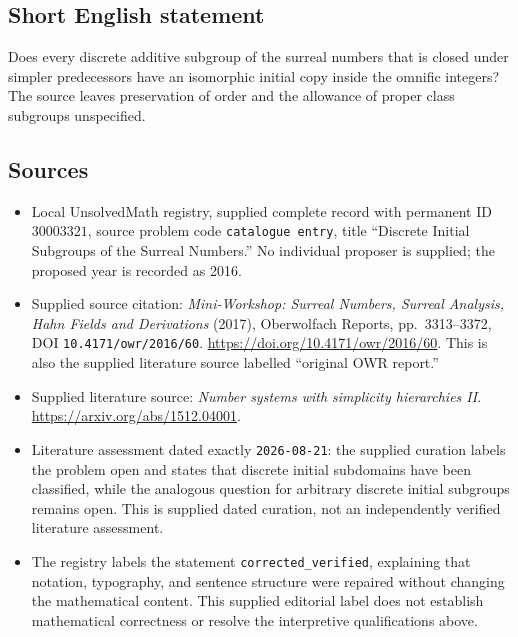 \documentclass[11pt]{article}
\begin{document}
\subsection{Short English statement}
Does every discrete additive subgroup of the surreal numbers that is closed under simpler predecessors have an isomorphic initial copy inside the omnific integers? The source leaves preservation of order and the allowance of proper class subgroups unspecified.
\subsection{Sources}
\begin{itemize}
\item Local UnsolvedMath registry, supplied complete record with permanent ID \(30003321\), source problem code \texttt{catalogue entry}, title ``Discrete Initial Subgroups of the Surreal Numbers.'' No individual proposer is supplied; the proposed year is recorded as 2016.
\item Supplied source citation: \emph{Mini-Workshop: Surreal Numbers, Surreal Analysis, Hahn Fields and Derivations} (2017), Oberwolfach Reports, pp.\ 3313--3372, DOI \texttt{10.4171/owr/2016/60}. \url{https://doi.org/10.4171/owr/2016/60}. This is also the supplied literature source labelled ``original OWR report.''
\item Supplied literature source: \emph{Number systems with simplicity hierarchies II}. \url{https://arxiv.org/abs/1512.04001}.
\item Literature assessment dated exactly \texttt{2026-08-21}: the supplied curation labels the problem open and states that discrete initial subdomains have been classified, while the analogous question for arbitrary discrete initial subgroups remains open. This is supplied dated curation, not an independently verified literature assessment.
\item The registry labels the statement \texttt{corrected\_verified}, explaining that notation, typography, and sentence structure were repaired without changing the mathematical content. This supplied editorial label does not establish mathematical correctness or resolve the interpretive qualifications above.
\end{itemize}
\end{document}
